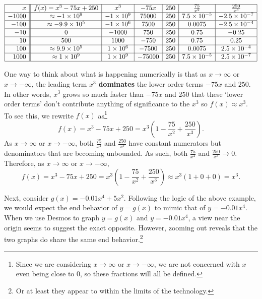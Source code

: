 \documentclass{ximera}
\begin{document}
\[ \begin{array}{|r||c|c|c|c|c|c|}  \hline

 x &  f(x) = x^3 -75x+250 &  x^3 & -75 x & 250 & \frac{75}{x^2} &  \frac{250}{x^3}  \\ \hline
 -1000 & \approx -1 \times 10^9  &   -1 \times 10^9 &75000  & 250 & 7.5 \times 10^{-5} & -2.5 \times 10^{-7} \\  \hline
 -100 & \approx -9.9 \times 10^5 & -1 \times 10^6 & 7500  & 250 & 0.0075 & -2.5 \times 10^{-4} \\  \hline
 -10 & 0  & -1000  & 750 & 250  & 0.75   & -0.25\\  \hline
 10 & 500 &  1000 &  -750 & 250   & 0.75  &  0.25   \\ \hline
 100 &\approx 9.9 \times 10^5  & 1 \times 10^6 &   -7500  & 250 &  0.0075 &   2.5 \times 10^{-4} \\ \hline
 1000 & \approx 1 \times 10^9 & 1 \times 10^9  & -75000 & 250 & 7.5 \times 10^{-5} & 2.5 \times 10^{-7} \\  \hline

\end{array} \]

One way to think about what is happening numerically is that  as $x \rightarrow \infty$ or $x \rightarrow -\infty$, the leading term $x^3$ \textbf{dominates} the lower order terms  $-75x$ and $250$.  In other words, $x^3$ grows so much faster than $-75 x$ and $250$ that these `lower order terms' don't contribute anything of significance to the $x^3$ so $f(x) \approx x^3$.    To see this, we rewrite $f(x)$ as\footnote{Since we are considering  $x \rightarrow \infty$ or $x \rightarrow -\infty$, we are not concerned with $x$ even being close to $0$, so these fractions will all be defined.}   \[f(x) = x^3  - 75x + 250 = x^3 \left(1 -  \frac{75}{x^2} + \frac{250}{x^3} \right).\]   As $x \rightarrow \infty$ or $x \rightarrow -\infty$, both $\frac{75}{x^2}$ and $\frac{250}{x^3}$ have constant numerators but denominators that are becoming unbounded.  As such, both  $\frac{75}{x^2}$ and $\frac{250}{x^3} \rightarrow 0$.  Therefore, as $x \rightarrow \infty$ or $x \rightarrow -\infty$, \[ f(x) = x^3 - 75x+250  = x^3 \left(1 -  \frac{75}{x^2} + \frac{250}{x^3} \right) \approx x^3 (1 + 0 + 0) = x^3. \]




Next, consider  $g(x) = -0.01x^4 + 5x^2$.  Following the logic of the above example, we would expect the end behavior of $y=g(x)$ to mimic that of $y = -0.01 x^4$.  When we use Desmos to graph $y = g(x)$ and $y = -0.01x^4$, a view near the origin seems to suggest the exact opposite.  However, zooming out reveals that the two graphs do share the same end behavior.\footnote{Or at least they appear to within the limits of the technology.}
\end{document}
